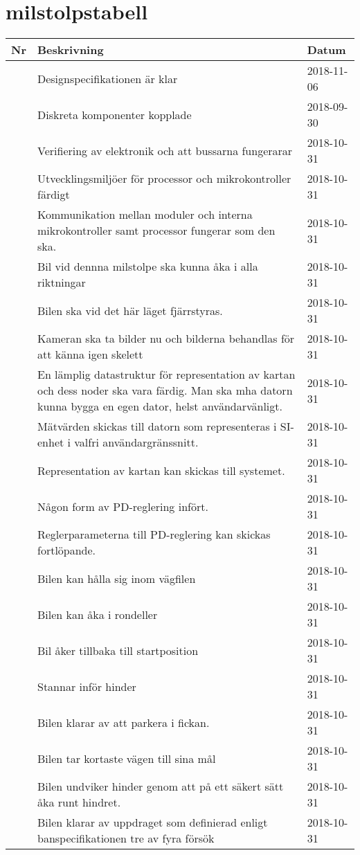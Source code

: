 \documentclass[projektplan/plan.tex]{subfiles}
\newcounter{milestoneNo} %
\newenvironment{milestonelist}
{
    \setlength{\tabcolsep}{12pt}
    \renewcommand{\arraystretch}{1.6}
    \begin{longtable}{p{4mm}p{75mm}p{25mm}}
        \bfseries Nr &
        \bfseries Beskrivning &
        \bfseries Datum 
	\\\hline\endhead
}{
    \end{longtable}
}
\newcommand{\milestone}[2]{
    \stepcounter{milestoneNo}
    \arabic{milestoneNo} & #1     & #2 \\\hline
}
\begin{document}
\section{milstolpstabell}

\begin{milestonelist}

\milestone{Designspecifikationen är klar}{2018-11-06}
\milestone{Diskreta komponenter kopplade}{2018-09-30}
\milestone{ Verifiering av elektronik och att bussarna fungerarar}{2018-10-31}

\milestone{ Utvecklingsmiljöer för processor och mikrokontroller färdigt}{2018-10-31}
\milestone{

 Kommunikation mellan moduler och interna mikrokontroller samt processor
fungerar som den ska.}{2018-10-31}

\milestone{ Bil vid dennna milstolpe ska kunna åka i alla riktningar}{2018-10-31}

\milestone{ Bilen ska vid det här läget fjärrstyras.}{2018-10-31}

\milestone{ Kameran ska ta bilder nu och bilderna behandlas för att känna igen
skelett}{2018-10-31}

\milestone{ En lämplig datastruktur för representation av kartan och dess noder ska vara
färdig. Man ska mha datorn kunna bygga en egen dator, helst användarvänligt.}{2018-10-31}


\milestone{ Mätvärden skickas till datorn som representeras i SI-enhet i valfri
användargränssnitt.}{2018-10-31}

 \milestone{Representation av kartan kan skickas till systemet.}{2018-10-31}

\milestone{ Någon form av PD-reglering infört.}{2018-10-31}

\milestone{ Reglerparameterna till PD-reglering kan skickas fortlöpande.}{2018-10-31}

\milestone{Bilen kan hålla sig inom vägfilen}{2018-10-31}

\milestone{Bilen kan åka i rondeller}{2018-10-31}

\milestone{ Bil åker tillbaka till startposition}{2018-10-31}

\milestone{Stannar inför hinder}{2018-10-31}

\milestone{ Bilen klarar av att parkera i fickan.}{2018-10-31}

\milestone{ Bilen tar kortaste vägen till sina mål}{2018-10-31}

\milestone{ Bilen undviker hinder genom att på ett säkert sätt åka runt
hindret.}{2018-10-31}

\milestone{ Bilen klarar av uppdraget som definierad enligt banspecifikationen tre av
fyra försök}{2018-10-31}

\end{milestonelist}

\newpage
\end{document}
